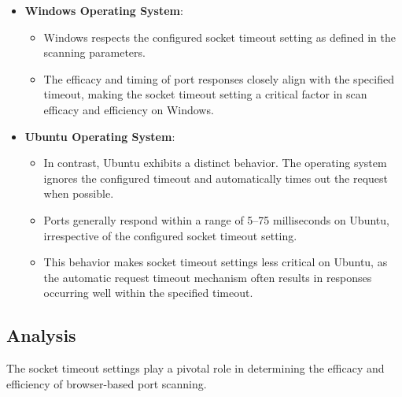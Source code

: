 \begin{itemize}
    \item \textbf{Windows Operating System}:
    \begin{itemize}
        \item Windows respects the configured socket timeout setting as defined in the scanning parameters.
        \item The efficacy and timing of port responses closely align with the specified timeout, making the socket timeout setting a critical factor in scan efficacy and efficiency on Windows.
    \end{itemize}
    
    \item \textbf{Ubuntu Operating System}:
    \begin{itemize}
        \item In contrast, Ubuntu exhibits a distinct behavior. The operating system ignores the configured timeout and automatically times out the request when possible.
        \item Ports generally respond within a range of 5--75 milliseconds on Ubuntu, irrespective of the configured socket timeout setting.
        \item This behavior makes socket timeout settings less critical on Ubuntu, as the automatic request timeout mechanism often results in responses occurring well within the specified timeout.
    \end{itemize}
\end{itemize}


\subsection{Analysis}

The socket timeout settings play a pivotal role in determining the efficacy and efficiency of browser-based port scanning.

